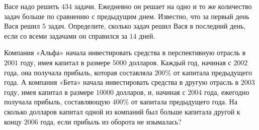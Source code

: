 \begin{class}[number=4]
\begin{listofex}
		\item Васе надо решить \( 434 \) задачи. Ежедневно он решает на одно и то же количество задач больше по сравнению с предыдущим днем. Известно, что за первый день Вася решил \( 5 \) задач. Определите, сколько задач решил Вася в последний день, если со всеми задачами он справился за \( 14 \) дней.
		\item Компания «Альфа» начала инвестировать средства в перспективную отрасль в \( 2001 \) году, имея капитал в размере \( 5000 \) долларов. Каждый год, начиная с \( 2002 \) года, она получала прибыль, которая составляла \( 200\% \) от капитала предыдущего года. А компания «Бета» начала инвестировать средства в другую отрасль в \( 2003 \) году, имея капитал в размере \( 10 000 \) долларов, и, начиная с \( 2004 \) года, ежегодно получала прибыль, составляющую \( 400\% \) от капитала предыдущего года. На сколько долларов капитал одной из компаний был больше капитала другой к концу \( 2006 \) года, если прибыль из оборота не изымалась?
	\end{listofex}
\end{class}

